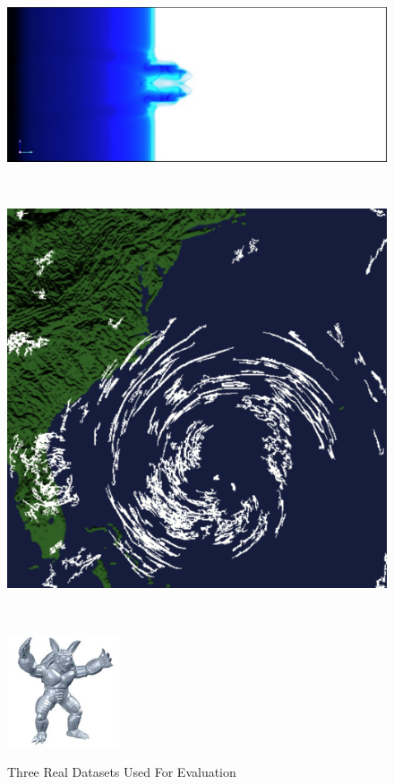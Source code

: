 \begin{figure}
		\begin{center}
			\begin{subfloat}{%
				\includegraphics[scale=0.3]{figures/ionisation_front_instabilities.pdf}
			}
			\end{subfloat}~
			\begin{subfloat}{%
				\includegraphics[scale=0.175]{figures/hurricane_isabel.pdf}
			}
			\end{subfloat}~
			\begin{subfloat} {%
				\includegraphics[scale=1.5]{figures/armadillo.pdf}
			}
			\end{subfloat}
		\end{center}

		\caption{Three Real Datasets Used For Evaluation}
		\label{fig:real-data}
\end{figure}

